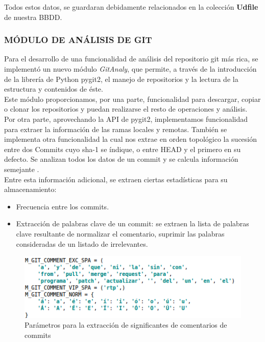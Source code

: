 Todos estos datos, se guardaran debidamente relacionados en la colección \textbf{Udfile} de nuestra BBDD.\\

\subsubsection{MÓDULO DE ANÁLISIS DE GIT} 
\label{subsec:mod_anal_git}

Para el desarrollo de una funcionalidad de análisis del repositorio git más rica, se implementó un nuevo módulo \textit{GitAnaly}, que permite, a través de la introducción de la librería de Python pygit2, el manejo de repositorios y la lectura de la estructura y contenidos de éste.\\


Este módulo proporcionamos, por una parte, funcionalidad para descargar, copiar o clonar los repositorios y puedan realizarse el resto de operaciones y análisis.\\


Por otra parte, aprovechando la API de pygit2, implementamos funcionalidad para extraer la información de las ramas locales y remotas. También se implementa otra funcionalidad la cual nos extrae en orden topológico la sucesión entre dos Commits cuyo sha-1 se índique, o entre HEAD y el primero en su defecto. Se analizan todos los datos de un commit y se calcula información semejante .\\


Entre esta información adicional, se extraen ciertas estadísticas para su almacenamiento:\\

\begin{itemize}
\item Frecuencia entre los commits.\\

\item Extracción de palabras clave de un commit: se extraen la lista de palabras clave resultante de normalizar el comentario, suprimir las palabras consideradas de un listado de irrelevantes.\\
\end{itemize}

\begin{figure}[H]
   \centering
   \includegraphics[width=16cm]{img/Selection_028_git_comentarios}
   \caption{Parámetros para la extracción de significantes de comentarios de commits}
   \label{figura:git_commnet}
\end{figure}

